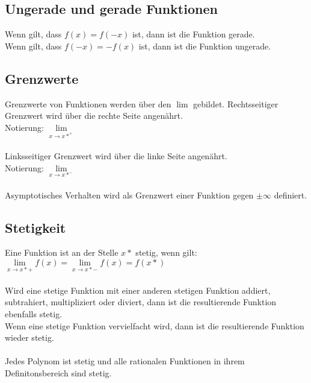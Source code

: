 \documentclass[a4paper,landscape, 11pt]{article}
\newcommand{\limFromTo}[2]{ \lim\limits_{#2 \rightarrow #1}}
\begin{document}
\begin{multicols}{4}
\begin{small}
             \subsection{Ungerade und gerade Funktionen}
                 Wenn gilt, dass $f(x) = f(-x)$ ist, dann ist die Funktion gerade. \\
                 Wenn gilt, dass $f(-x) = -f(x)$ ist, dann ist die Funktion ungerade.
              
              \subsection{Grenzwerte}
                  Grenzwerte von Funktionen werden über den $\lim$ gebildet.
                  Rechtsseitiger Grenzwert wird über die rechte Seite angenährt. \\
                  Notierung: $\limFromTo{x*^+}{x}$ \\ 
                  \\
                  Linksseitiger Grenzwert wird über die linke Seite angenährt. \\
                  Notierung: $\limFromTo{x*^-}{x}$ \\ 
                  \\
                  Asymptotisches Verhalten wird als Grenzwert einer Funktion gegen $\pm \infty$ definiert.
              \subsection{Stetigkeit}
                  Eine Funktion ist an der Stelle $x*$ stetig, wenn gilt:\\
                  $\limFromTo{x*+}{x} f(x) = \limFromTo{x*-}{x} f(x) = f(x*)$
                  \\ \\
                  Wird eine stetige Funktion mit einer anderen stetigen Funktion addiert, subtrahiert, multipliziert oder diviert, dann ist die resultierende Funktion ebenfalls stetig.\\
                  Wenn eine stetige Funktion vervielfacht wird, dann ist die resultierende Funktion wieder stetig. \\
                  \\
                  Jedes Polynom ist stetig und alle rationalen Funktionen in ihrem Definitonsbereich sind stetig.
                                    

\end{small}
\end{multicols}
\end{document}
